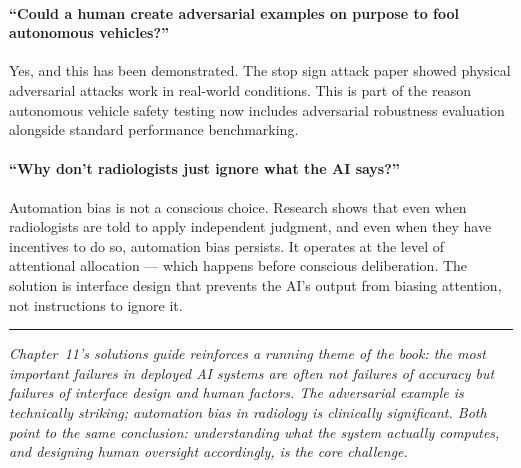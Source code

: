 \paragraph{``Could a human create adversarial examples on purpose to fool autonomous vehicles?''}
Yes, and this has been demonstrated. The stop sign attack paper showed physical adversarial attacks work in real-world conditions. This is part of the reason autonomous vehicle safety testing now includes adversarial robustness evaluation alongside standard performance benchmarking.

\paragraph{``Why don't radiologists just ignore what the AI says?''}
Automation bias is not a conscious choice. Research shows that even when radiologists are told to apply independent judgment, and even when they have incentives to do so, automation bias persists. It operates at the level of attentional allocation --- which happens before conscious deliberation. The solution is interface design that prevents the AI's output from biasing attention, not instructions to ignore it.

\bigskip
\begin{center}
\rule{0.5\textwidth}{0.4pt}
\end{center}
\bigskip

\noindent\textit{Chapter~11's solutions guide reinforces a running theme of the book: the most important failures in deployed AI systems are often not failures of accuracy but failures of interface design and human factors. The adversarial example is technically striking; automation bias in radiology is clinically significant. Both point to the same conclusion: understanding what the system actually computes, and designing human oversight accordingly, is the core challenge.}
